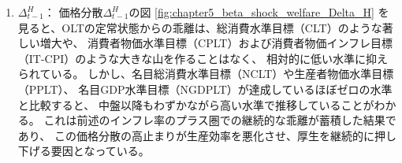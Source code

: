 \begin{enumerate}
        この継続的な乖離が価格分散を通じて厚生を悪化させる要因となっている。
    \item
    \label{itm:chapter5_beta_shock_policies_olt_Delta_t_minus_1_H}
        \(\Delta_{t-1}^H\)：
        価格分散\(\Delta_{t-1}^H\)の図
        \ref{fig:chapter5_beta_shock_welfare_Delta_H}
        を見ると、OLTの定常状態からの乖離は、総消費水準目標（CLT）のような著しい増大や、
        消費者物価水準目標（CPLT）および消費者物価インフレ目標（IT-CPI）のような大きな山を作ることはなく、
        相対的に低い水準に抑えられている。
        しかし、名目総消費水準目標（NCLT）や生産者物価水準目標（PPLT）、
        名目GDP水準目標（NGDPLT）が達成しているほぼゼロの水準と比較すると、
        中盤以降もわずかながら高い水準で推移していることがわかる。
        これは前述のインフレ率のプラス圏での継続的な乖離が蓄積した結果であり、
        この価格分散の高止まりが生産効率を悪化させ、厚生を継続的に押し下げる要因となっている。
\end{enumerate}